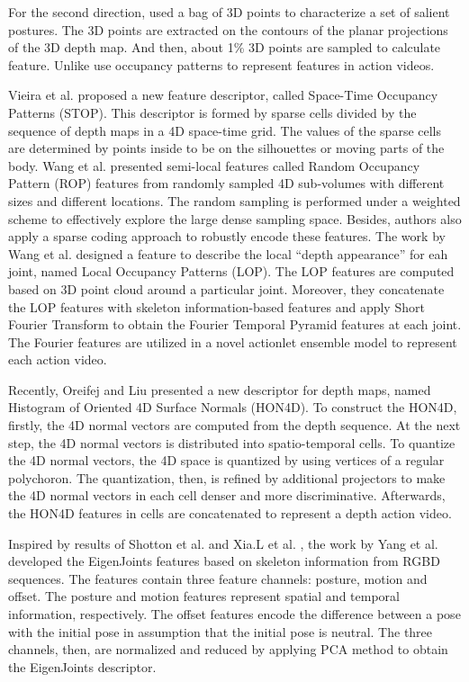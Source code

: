 \documentclass[final,3p,times,twocolumn]{elsarticle}
\begin{document}
For the second direction, \cite{li2010action} used a bag of 3D points to characterize a set of salient postures. The 3D points are extracted on the contours of the planar projections of the 3D depth map. And then, about 1\% 3D points are sampled to calculate feature. Unlike \cite{li2010action,vieira2012stop, wang2012robust, wang2012mining} use occupancy patterns to represent features in action videos.

Vieira et al. \cite{vieira2012stop} proposed a new feature descriptor, called Space-Time Occupancy Patterns (STOP). This descriptor is formed by sparse cells divided by the sequence of depth maps in a 4D space-time grid. The values of the sparse cells are determined by points inside to be on the silhouettes or moving parts of the body. Wang et al. \cite{wang2012robust} presented semi-local features called Random Occupancy Pattern (ROP) features from randomly sampled 4D sub-volumes with different sizes and different locations. The random sampling is performed under a weighted scheme to effectively explore the large dense sampling space. Besides, authors also apply a sparse coding approach to robustly encode these features. The work by Wang et al. \cite{wang2012mining} designed a feature to describe the local ``depth appearance'' for eah joint, named Local Occupancy Patterns (LOP). The LOP features are computed based on 3D point cloud around a particular joint. Moreover, they concatenate the LOP features with skeleton information-based features and apply Short Fourier Transform to obtain the Fourier Temporal Pyramid features at each joint. The Fourier features are utilized in a novel actionlet ensemble model to represent each action video.

Recently, Oreifej and Liu \cite{oreifej2013hon4d} presented a new descriptor for depth maps, named Histogram of Oriented 4D Surface Normals (HON4D). To construct the HON4D, firstly, the 4D normal vectors are computed from the depth sequence. At the next step, the 4D normal vectors is distributed into spatio-temporal cells. To quantize the 4D normal vectors, the 4D space is quantized by using vertices of a regular polychoron. The quantization, then, is refined by additional projectors to make the 4D normal vectors in each cell denser and more discriminative. Afterwards, the HON4D features in cells are concatenated to represent a depth action video.

Inspired by results of Shotton et al. \cite{shotton2013real} and Xia.L et al. \cite{xia2011human}, the work by Yang et al. \cite{yang2012eigenjoints} developed the EigenJoints features based on skeleton information from RGBD sequences. The features contain three feature channels: posture, motion and offset. The posture and motion features represent spatial and temporal information, respectively. The offset features encode the difference between a pose with the initial pose in assumption that the initial pose is neutral. The three channels, then, are normalized and reduced by applying PCA method to obtain the EigenJoints descriptor.
\end{document}
